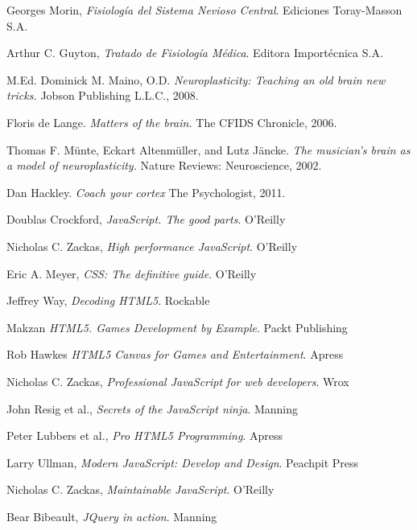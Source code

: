 \documentclass[12pt,a4paper]{article}
\begin{document}
\begin{thebibliography}{100}

  Georges Morin,
  \emph{Fisiología del Sistema Nevioso Central}.
  Ediciones Toray-Masson S.A.

  Arthur C. Guyton,
  \emph{Tratado de Fisiología Médica}.
  Editora Importécnica S.A.

  M.Ed. Dominick M. Maino, O.D. 
  \emph{Neuroplasticity: Teaching an old brain new tricks.}
  Jobson Publishing L.L.C., 2008.

  Floris de Lange.
  \emph{Matters of the brain.}
  The CFIDS Chronicle, 2006.

  Thomas F. Münte, Eckart Altenmüller, and Lutz Jäncke.
  \emph{The musician’s brain as a model of neuroplasticity.}
  Nature Reviews: Neuroscience, 2002.

  Dan Hackley.
  \emph{Coach your cortex}
  The Psychologist, 2011.


  Doublas Crockford,
  \emph{JavaScript. The good parts}. O'Reilly

  Nicholas C. Zackas,
  \emph{High performance JavaScript}. O'Reilly

  Eric A. Meyer,
  \emph{CSS: The definitive guide}. O'Reilly

  Jeffrey Way,
  \emph{Decoding HTML5}. Rockable

  Makzan
  \emph{HTML5. Games Development by Example}. Packt Publishing

  Rob Hawkes
  \emph{HTML5 Canvas for Games and Entertainment}. Apress


  Nicholas C. Zackas,
  \emph{Professional JavaScript for web developers}. Wrox

  John Resig et al.,
  \emph{Secrets of the JavaScript ninja}. Manning

  Peter Lubbers et al.,
  \emph{Pro HTML5 Programming}. Apress

  Larry Ullman,
  \emph{Modern JavaScript: Develop and Design}. Peachpit Press

  Nicholas C. Zackas,
  \emph{Maintainable JavaScript}. O'Reilly

  Bear Bibeault,
  \emph{JQuery in action}. Manning



\end{thebibliography}
\end{document}
